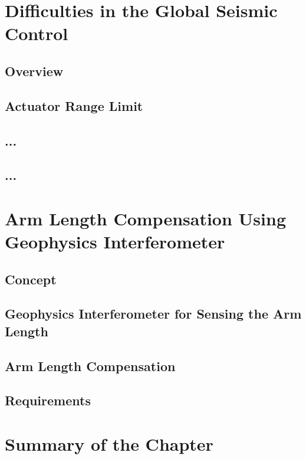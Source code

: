 %
\section{Difficulties in the Global Seismic Control}
\subsection{Overview}
\subsection{Actuator Range Limit}
\subsection{...}
\subsection{...}


%
\section{Arm Length Compensation Using Geophysics Interferometer}
\subsection{Concept}
\subsection{Geophysics Interferometer for Sensing the Arm Length}
\subsection{Arm Length Compensation}
\subsection{Requirements}


\section{Summary of the Chapter}
